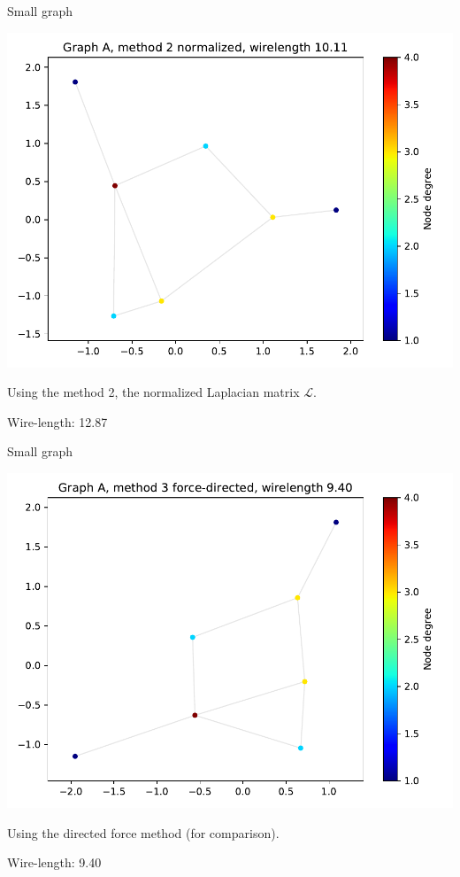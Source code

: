 \documentclass[serif, 12pt]{beamer}
\begin{document}
\begin{frame}{Small graph}
\begin{center}
\includegraphics[scale=0.5]{A/norm.pdf}
\end{center}
Using the method 2, the normalized Laplacian matrix $\mathcal L$.

Wire-length: 12.87
\end{frame}

\begin{frame}{Small graph}
\begin{center}
\includegraphics[scale=0.5]{A/spring.pdf}
\end{center}
Using the directed force method (for comparison).

Wire-length: 9.40
\end{frame}
\end{document}
